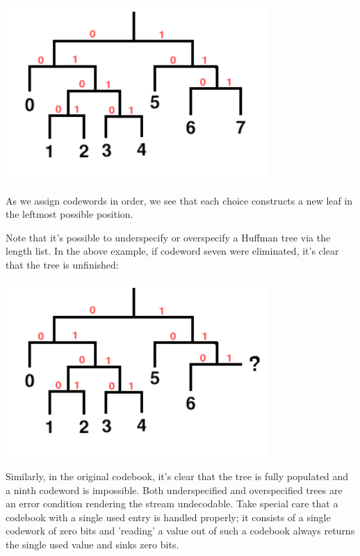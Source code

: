 \begin{center}
\includegraphics[width=10cm]{hufftree}
\end{center}


As we assign codewords in order, we see that each choice constructs a
new leaf in the leftmost possible position.

Note that it's possible to underspecify or overspecify a Huffman tree
via the length list.  In the above example, if codeword seven were
eliminated, it's clear that the tree is unfinished:

\begin{center}
\includegraphics[width=10cm]{hufftree-under}
\end{center}


Similarly, in the original codebook, it's clear that the tree is fully
populated and a ninth codeword is impossible.  Both underspecified and
overspecified trees are an error condition rendering the stream
undecodable. Take special care that a codebook with a single used
entry is handled properly; it consists of a single codework of zero
bits and 'reading' a value out of such a codebook always returns the
single used value and sinks zero bits.  


